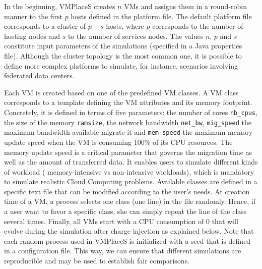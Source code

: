\documentclass[conference]{IEEEtran}
\newcommand{\vmps}{VMPlaceS\xspace}
\begin{document}
In the beginning, \vmps creates $n$ VMs and assigns them in a
round-robin manner to the first $p$ hosts defined in the platform
file.  The default platform file corresponds to a cluster of $p+s$
hosts, where $p$ corresponds to the number of hosting nodes and $s$ to
the number of services nodes. The values $n$, $p$ and $s$ constitute
input parameters of the simulations (specified in a Java properties
file).
Although the cluster topology is the most
common one, it is possible to define more complex platforms to simulate,
for instance, scenarios involving federated data centers.

Each VM is created based on one of the predefined VM classes. A VM
class corresponds to a template defining the VM attributes and its
memory footprint. Concretely, it is
defined in terms of five parameters: the number of cores
\texttt{nb\_cpus}, the size of the memory \texttt{ramsize}, the
network bandwidth \texttt{net\_bw}, \texttt{mig\_speed} the maximum
bandwidth available migrate it and \texttt{mem\_speed} the maximum
memory update speed when the VM is consuming 100\% of its CPU
resources. The memory update speed is a critical parameter that
governs the migration time as well as the amount of transferred
data. It enables users to simulate different kinds of workload (\ie
memory-intensive vs non-intensive workloads), which is mandatory to
simulate realistic Cloud Computing problems.  Available classes are
defined in a specific text file that can be modified according to the
user's needs.    At creation time
of a VM, a process selects one class (\ie one line) in the file
randomly. Hence, if a user want to favor a specific class, she can
simply repeat the line of the class several times. Finally, all VMs
start with a CPU consumption of 0 that will evolve during the
simulation after charge injection as explained below.  Note that each
random process used in \vmps is initialized with a seed that is
defined in a configuration file. This way, we can ensure that
different simulations are reproducible and may be used to establish
fair comparisons.
\end{document}
